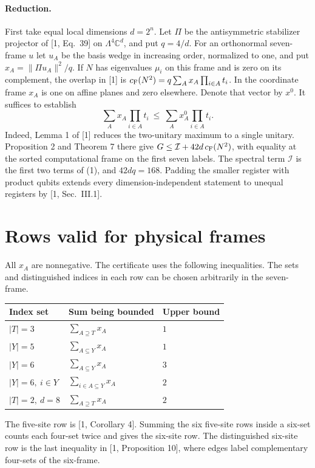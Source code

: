 \documentclass[11pt]{article}
\begin{document}
\paragraph{Reduction.} First take equal local dimensions $d=2^n$. Let $\Pi$ be the antisymmetric stabilizer projector of [1, Eq.~39] on $\Lambda^4\mathbb C^d$, and put $q=4/d$. For an orthonormal seven-frame $u$ let $u_A$ be the basis wedge in increasing order, normalized to one, and put $x_A=\|\Pi u_A\|^2/q$. If $N$ has eigenvalues $\mu_i$ on this frame and is zero on its complement, the overlap in [1] is $c_{\rm F}(N^2)=q\sum_A x_A\prod_{i\in A}t_i$. In the coordinate frame $x_A$ is one on affine planes and zero elsewhere. Denote that vector by $x^0$. It suffices to establish
\[
 \sum_A x_A\prod_{i\in A}t_i\ \leq\ \sum_A x_A^0\prod_{i\in A}t_i. \tag{2}
\]
Indeed, Lemma 1 of [1] reduces the two-unitary maximum to a single unitary. Proposition 2 and Theorem 7 there give $G\leq \mathcal I+42d\,c_{\rm F}(N^2)$, with equality at the sorted computational frame on the first seven labels. The spectral term $\mathcal I$ is the first two terms of (1), and $42dq=168$. Padding the smaller register with product qubits extends every dimension-independent statement to unequal registers by [1, Sec.~III.1].

\section{Rows valid for physical frames}
All $x_A$ are nonnegative. The certificate uses the following inequalities. The sets and distinguished indices in each row can be chosen arbitrarily in the seven-frame.
\begin{center}\begin{tabular}{lll}
\toprule
Index set & Sum being bounded & Upper bound\\
\midrule
$|T|=3$ & $\sum_{A\supseteq T}x_A$ & $1$\\
$|Y|=5$ & $\sum_{A\subseteq Y}x_A$ & $1$\\
$|Y|=6$ & $\sum_{A\subseteq Y}x_A$ & $3$\\
$|Y|=6,\ i\in Y$ & $\sum_{i\in A\subseteq Y}x_A$ & $2$\\
$|T|=2,\ d=8$ & $\sum_{A\supseteq T}x_A$ & $2$\\
\bottomrule\end{tabular}\end{center}
The five-site row is [1, Corollary 4]. Summing the six five-site rows inside a six-set counts each four-set twice and gives the six-site row. The distinguished six-site row is the last inequality in [1, Proposition 10], where edges label complementary four-sets of the six-frame.
\end{document}
